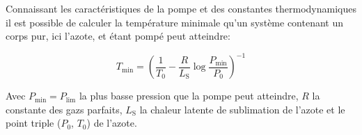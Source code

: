 Connaissant les caractéristiques de la pompe et des constantes thermodynamiques il est possible de calculer la température minimale qu'un système contenant un corps pur, ici l'azote, et étant pompé peut atteindre:

\begin{equation}
    T_\textrm{min} = \left(\frac{1}{T_\textrm{0}} - \frac{R}{L_\textrm{S}}\log\frac{P_\textrm{min}}{P_\textrm{0}}\right)^{-1}
    \label{eq:Tmin}
\end{equation}

Avec \(P_\textrm{min} = P_\textrm{lim}\) la plus basse pression que la pompe peut atteindre, \(R\) la constante des gazs parfaits, \(L_\textrm{S}\) la chaleur latente de sublimation de l'azote et le point triple (\(P_\textrm{0}\), \(T_\textrm{0}\)) de l'azote. 
